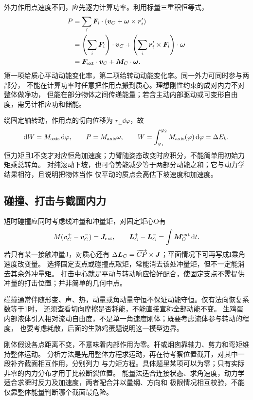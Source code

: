 {外力作用点速度不同，应先逐力计算功率。利用标量三重积恒等式，
\begin{align}
 P&=\sum_i\bm{F}_i\cdot(\bm{v}_C+\bm{\omega}\times\bm{r}_i')\\
 &=\left(\sum_i\bm{F}_i\right)\cdot\bm{v}_C+
 \left(\sum_i\bm{r}_i'\times\bm{F}_i\right)\cdot\bm{\omega}\\
 &=\bm{F}_{\rm ext}\cdot\bm{v}_C+\bm{M}_C\cdot\bm{\omega}.
\end{align}
第一项给质心平动动能变化率，第二项给转动动能变化率。同一外力可同时参与两部分，
不能在计算功率时任意把作用点搬到质心。理想刚性约束的成对内力不对整体做净功，
但能在部分物体之间传递能量；若含主动内部驱动或可变形自由度，需另计相应功和储能。

绕固定轴转动，作用点的切向位移为 $r_\perp\dd\varphi$，故
\begin{equation}
 \mathop{}\!\mathrm d W=M_{\rm axis}\mathop{}\!\mathrm d\varphi,\qquad P=M_{\rm axis}\omega,
 \qquad W=\int_{\varphi_1}^{\varphi_2}M_{\rm axis}(\varphi)\mathop{}\!\mathrm d\varphi=\Delta E_k.
\end{equation}
恒力矩且I不变才对应恒角加速度；力臂随姿态改变时应积分，不能简单用初始力矩乘总转角。
对纯滚动下坡，也可令势能减少等于两部分动能之和；它与动力学结果相符，且说明把物体当作
仅平动的质点会高估下坡速度和加速度。

\subsection{碰撞、打击与截面内力}
短时碰撞应同时考虑线冲量和冲量矩，对固定矩心O有
\begin{equation}
 M(\bm{v}_C^+-\bm{v}_C^-)=\bm{J}_{\rm ext},\qquad
 \bm{L}_O^+-\bm{L}_O^-=\int\bm{M}_O^{\rm ext}\mathop{}\!\mathrm d t.
\end{equation}
若只有某一接触冲量J，对质心还有
$\Delta\bm{L}_C=\overrightarrow{CP}\times\bm{J}$；平面情况下可再写成I乘角速度改变量。
选择固定支点或碰撞点取矩，常能消去该处冲量矩，但不一定能消去其余外冲量矩。
打击中心就是平动与转动响应恰好配合，使固定支点不需提供冲量的打击位置；并非简单的几何中点。

碰撞通常伴随形变、声、热，动量或角动量守恒不保证动能守恒。仅有法向恢复系数等于1时，
还须查看切向摩擦是否耗能，不能直接宣称全部动能不变。
生鸡蛋内部液体引入相对流动自由度，不是单一角速度刚体；既要考虑流体参与转动的程度，
也要考虑耗散，后面的生熟鸡蛋题说明这一模型边界。

刚体假设各点距离不变，不意味着内部作用为零。杆或烟囱靠轴力、剪力和弯矩维持整体运动。
分析方法是先用整体方程求运动，再在待考察位置截开，对其中一段补齐截面相互作用，分别列力
与力矩方程。具体题里某项可以为零；只有实际非零的内力分布才用于比较断裂位置。
能量法适合连接状态、求角速度，动力学适合求瞬时反力及加速度，两者配合并以量纲、方向和
极限情况相互校验，不能仅靠整体能量判断哪个截面最危险。


}
